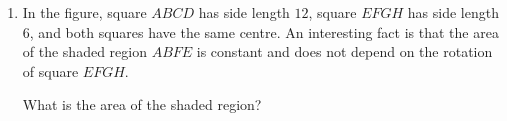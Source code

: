 \documentclass[12pt]{article}
\begin{document}
\begin{enumerate}[topsep=2\bigskipamount,itemsep=1.4\bigskipamount]
\item
\begin{multicols}{2}
In the figure, square $ABCD$ has side length $12$, square $EFGH$ has side length $6$, and both squares have the same centre.
An interesting fact is that the area of the shaded region $ABFE$ is constant and does not depend on the rotation of square $EFGH$.

What is the area of the shaded region?
\vspace*{24pt}
\columnbreak
\begin{center}
\end{center}
\end{multicols}





\end{enumerate}
\end{document}
